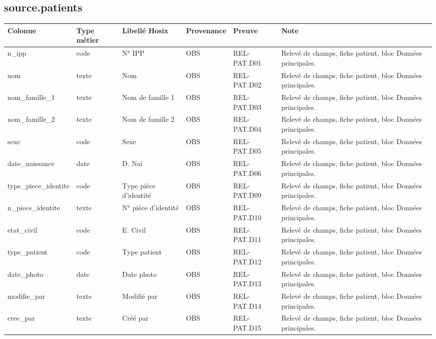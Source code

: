 
\subsection*{source.patients}
\begin{longtable}{p{2.5cm}p{1.8cm}p{2.8cm}p{1.3cm}p{2.2cm}p{5cm}}
\hline
Colonne & Type métier & Libellé Hosix & Provenance & Preuve & Note \\
\hline
\endhead
n\_ipp & code & N° IPP & OBS & REL-PAT.D01 & Relevé de champs, fiche patient, bloc Données principales. \\
nom & texte & Nom & OBS & REL-PAT.D02 & Relevé de champs, fiche patient, bloc Données principales. \\
nom\_famille\_1 & texte & Nom de famille 1 & OBS & REL-PAT.D03 & Relevé de champs, fiche patient, bloc Données principales. \\
nom\_famille\_2 & texte & Nom de famille 2 & OBS & REL-PAT.D04 & Relevé de champs, fiche patient, bloc Données principales. \\
sexe & code & Sexe & OBS & REL-PAT.D05 & Relevé de champs, fiche patient, bloc Données principales. \\
date\_naissance & date & D. Nai & OBS & REL-PAT.D06 & Relevé de champs, fiche patient, bloc Données principales. \\
type\_piece\_identite & code & Type pièce d'identité & OBS & REL-PAT.D09 & Relevé de champs, fiche patient, bloc Données principales. \\
n\_piece\_identite & texte & N° pièce d'identité & OBS & REL-PAT.D10 & Relevé de champs, fiche patient, bloc Données principales. \\
etat\_civil & code & E. Civil & OBS & REL-PAT.D11 & Relevé de champs, fiche patient, bloc Données principales. \\
type\_patient & code & Type patient & OBS & REL-PAT.D12 & Relevé de champs, fiche patient, bloc Données principales. \\
date\_photo & date & Date photo & OBS & REL-PAT.D13 & Relevé de champs, fiche patient, bloc Données principales. \\
modifie\_par & texte & Modifié par & OBS & REL-PAT.D14 & Relevé de champs, fiche patient, bloc Données principales. \\
cree\_par & texte & Créé par & OBS & REL-PAT.D15 & Relevé de champs, fiche patient, bloc Données principales. \\

\end{longtable}
